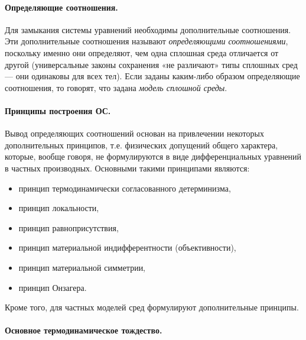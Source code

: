 \paragraph{Определяющие соотношения.}
Для замыкания системы уравнений необходимы дополнительные соотношения. Эти дополнительные
соотношения называют \emph{определяющими соотношениями}, поскольку именно они определяют, чем одна
сплошная среда отличается от другой (универсальные законы сохранения «не различают» типы
сплошных сред — они одинаковы для всех тел). Если заданы каким-либо образом определяющие
соотношения, то говорят, что задана \emph{модель сплошной среды}.

\paragraph{Принципы построения ОС.}
Вывод определяющих соотношений основан на привлечении некоторых дополнительных принципов,
т.е. физических допущений общего характера, которые, вообще говоря, не формулируются в виде
дифференциальных уравнений в частных производных. Основными такими принципами являются:
\begin{itemize}
  \item принцип термодинамически согласованного детерминизма,
  \item принцип локальности,
  \item принцип равноприсутствия,
  \item принцип материальной индифферентности (объективности),
  \item принцип материальной симметрии,
  \item принцип Онзагера.
\end{itemize}
Кроме того, для частных моделей сред формулируют дополнительные принципы.

\paragraph{Основное термодинамическое тождество.}
